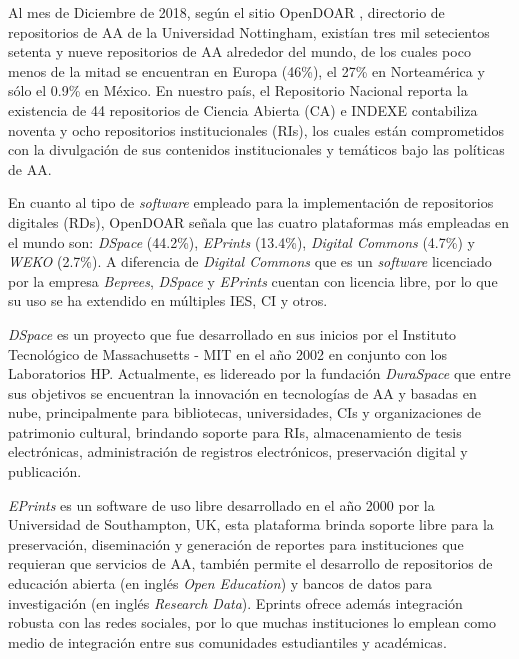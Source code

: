 Al mes de Diciembre de 2018, según el sitio OpenDOAR \cite{OpenDOAR}, directorio de repositorios de AA de la Universidad Nottingham, existían tres mil setecientos setenta y nueve repositorios de AA alrededor del mundo, de los cuales poco menos de la mitad se encuentran en Europa (46\%), el 27\% en Norteamérica y sólo el 0.9\% en México. En nuestro país, el Repositorio Nacional \cite{RepositorioNacional} reporta la existencia de 44 repositorios de Ciencia Abierta (CA) e INDEXE \cite{RI_REMERI} contabiliza noventa y ocho repositorios institucionales (RIs), los cuales están comprometidos con la divulgación de sus contenidos institucionales y temáticos bajo las políticas de AA.\newline

En cuanto al tipo de \textit{software} empleado para la implementación de repositorios digitales (RDs), OpenDOAR \cite{OpenDOAR} señala que las cuatro plataformas más empleadas en el mundo son: \textit{DSpace} \cite{DSpaceRef} (44.2\%), \textit{EPrints} (13.4\%), \textit{Digital Commons} (4.7\%) y \textit{WEKO} (2.7\%). A diferencia de \textit{Digital Commons} que es un \textit{software} licenciado por la empresa \textit{Beprees}, \textit{DSpace} y \textit{EPrints} cuentan con licencia libre, por lo que su uso se ha extendido en múltiples IES, CI y otros.\newline

\textit{DSpace} \cite{DSpaceRef} es un proyecto que fue desarrollado en sus inicios por el Instituto Tecnológico de Massachusetts - MIT en el año 2002 en conjunto con los Laboratorios HP. Actualmente, es lidereado por la fundación \textit{DuraSpace} que entre sus objetivos se encuentran la innovación en tecnologías de AA y basadas en nube, principalmente para bibliotecas, universidades, CIs y organizaciones de patrimonio cultural, brindando soporte para RIs, almacenamiento de tesis electrónicas, administración de registros electrónicos, preservación digital y publicación.\newline

\textit{EPrints} \cite{EPrints} es un software de uso libre desarrollado en el año 2000 por la Universidad de Southampton, UK, esta plataforma brinda soporte libre para la preservación, diseminación y generación de reportes para instituciones que requieran que servicios de AA, también permite el desarrollo de repositorios de educación abierta (en inglés \textit{Open Education}) y bancos de datos para investigación (en inglés \textit{Research Data}). Eprints ofrece además integración robusta con las redes sociales, por lo que muchas instituciones lo emplean como medio de integración entre sus comunidades estudiantiles y académicas.\newline

